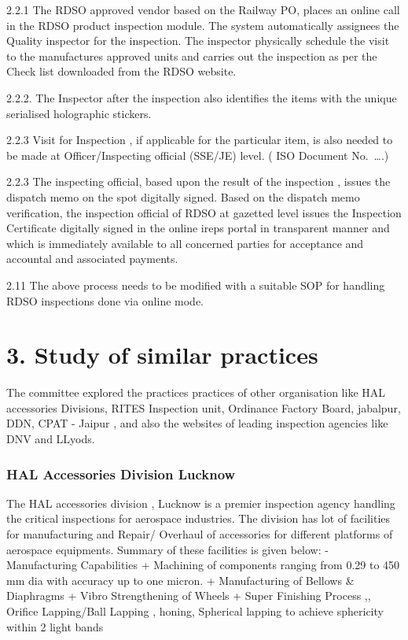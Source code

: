 \documentclass[
]{article}
\begin{document}
2.2.1 The RDSO approved vendor based on the Railway PO, places an online
call in the RDSO product inspection module. The system automatically
assignees the Quality inspector for the inspection. The inspector
physically schedule the visit to the manufactures approved units and
carries out the inspection as per the Check list downloaded from the
RDSO website.

2.2.2. The Inspector after the inspection also identifies the items with
the unique serialised holographic stickers.

2.2.3 Visit for Inspection , if applicable for the particular item, is
also needed to be made at Officer/Inspecting official (SSE/JE) level. (
ISO Document No.~\ldots.)

2.2.3 The inspecting official, based upon the result of the inspection ,
issues the dispatch memo on the spot digitally signed. Based on the
dispatch memo verification, the inspection official of RDSO at gazetted
level issues the Inspection Certificate digitally signed in the online
ireps portal in transparent manner and which is immediately available to
all concerned parties for acceptance and accountal and associated
payments.

2.11 The above process needs to be modified with a suitable SOP for
handling RDSO inspections done via online mode.

\hypertarget{study-of-similar-practices}{%
\section{3. Study of similar
practices}\label{study-of-similar-practices}}

The committee explored the practices practices of other organisation
like HAL accessories Divisions, RITES Inspection unit, Ordinance Factory
Board, jabalpur, DDN, CPAT - Jaipur , and also the websites of leading
inspection agencies like DNV and LLyods.

\hypertarget{hal-accessories-division-lucknow}{%
\subsubsection{HAL Accessories Division
Lucknow}\label{hal-accessories-division-lucknow}}

The HAL accessories division , Lucknow is a premier inspection agency
handling the critical inspections for aerospace industries. The division
has lot of facilities for manufacturing and Repair/ Overhaul of
accessories for different platforms of aerospace equipments. Summary of
these facilities is given below: - Manufacturing Capabilities +
Machining of components ranging from 0.29 to 450 mm dia with accuracy up
to one micron. + Manufacturing of Bellows \& Diaphragms + Vibro
Strengthening of Wheels + Super Finishing Process ,, Orifice
Lapping/Ball Lapping , honing, Spherical lapping to achieve sphericity
within 2 light bands
\end{document}
